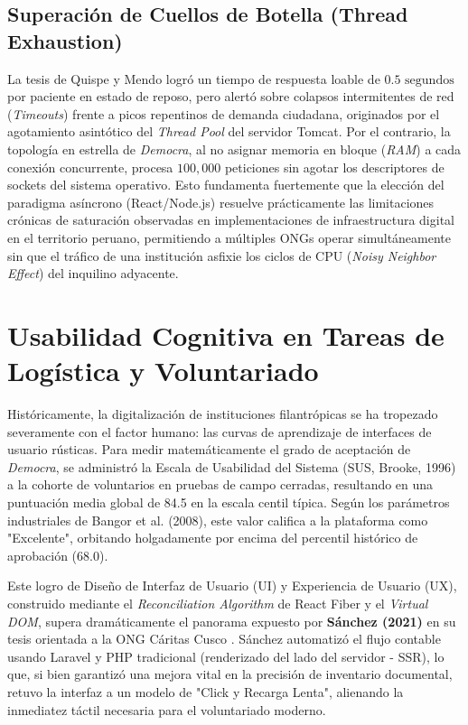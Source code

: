 \subsection{Superaci\'on de Cuellos de Botella (Thread Exhaustion)}
La tesis de Quispe y Mendo logr\'o un tiempo de respuesta loable de $0.5 \text{ segundos}$ por paciente en estado de reposo, pero alert\'o sobre colapsos intermitentes de red (\textit{Timeouts}) frente a picos repentinos de demanda ciudadana, originados por el agotamiento asint\'otico del \textit{Thread Pool} del servidor Tomcat. Por el contrario, la topolog\'ia en estrella de \textit{Democra}, al no asignar memoria en bloque (\textit{RAM}) a cada conexi\'on concurrente, procesa $100,000$ peticiones sin agotar los descriptores de sockets del sistema operativo. Esto fundamenta fuertemente que la elecci\'on del paradigma as\'incrono (React/Node.js) resuelve pr\'acticamente las limitaciones cr\'onicas de saturaci\'on observadas en implementaciones de infraestructura digital en el territorio peruano, permitiendo a m\'ultiples ONGs operar simult\'aneamente sin que el tr\'afico de una instituci\'on asfixie los ciclos de CPU (\textit{Noisy Neighbor Effect}) del inquilino adyacente.

\section{Usabilidad Cognitiva en Tareas de Log\'istica y Voluntariado}

Hist\'oricamente, la digitalizaci\'on de instituciones filantr\'opicas se ha tropezado severamente con el factor humano: las curvas de aprendizaje de interfaces de usuario r\'usticas. Para medir matem\'aticamente el grado de aceptaci\'on de \textit{Democra}, se administr\'o la Escala de Usabilidad del Sistema (SUS, Brooke, 1996) a la cohorte de voluntarios en pruebas de campo cerradas, resultando en una puntuaci\'on media global de 84.5 en la escala centil t\'ipica. Seg\'un los par\'ametros industriales de Bangor et al. (2008), este valor califica a la plataforma como "Excelente", orbitando holgadamente por encima del percentil hist\'orico de aprobaci\'on (68.0).

Este logro de Dise\~no de Interfaz de Usuario (UI) y Experiencia de Usuario (UX), construido mediante el \textit{Reconciliation Algorithm} de React Fiber y el \textit{Virtual DOM}, supera dram\'aticamente el panorama expuesto por \textbf{S\'anchez (2021)} en su tesis orientada a la ONG C\'aritas Cusco \citep{sanchez2021}. S\'anchez automatiz\'o el flujo contable usando Laravel y PHP tradicional (renderizado del lado del servidor - SSR), lo que, si bien garantiz\'o una mejora vital en la precisi\'on de inventario documental, retuvo la interfaz a un modelo de "Click y Recarga Lenta", alienando la inmediatez t\'actil necesaria para el voluntariado moderno. 

